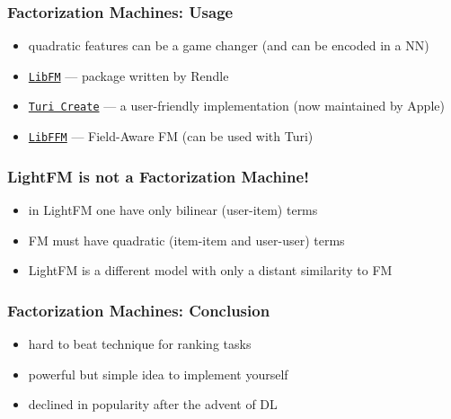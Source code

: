 \documentclass{beamer}
\begin{document}
\begin{frame}
  \frametitle{Factorization Machines: Usage}
  \begin{itemize}
  \item quadratic features can be a game changer (and can be encoded in a NN)
  \item \href{http://libfm.org/}{\texttt{LibFM}} --- package written by Rendle
  \item \href{https://pypi.org/project/turicreate}{\texttt{Turi Create}} --- a user-friendly implementation (now maintained by Apple)
  \item \href{https://github.com/ycjuan/libffm}{\texttt{LibFFM}} --- Field-Aware FM (can be used with Turi)
  \end{itemize}
\end{frame}
\begin{frame}
  \frametitle{LightFM is not a Factorization Machine!}
  \begin{itemize}
  \item in LightFM one have only bilinear (user-item) terms
  \item FM must have quadratic (item-item and user-user) terms
  \item LightFM is a different model with only a distant similarity to FM
  \end{itemize}
\end{frame}
\begin{frame}
  \frametitle{Factorization Machines: Conclusion}
  \begin{itemize}
  \item hard to beat technique for ranking tasks
  \item powerful but simple idea to implement yourself
  \item declined in popularity after the advent of DL
  \end{itemize}
\end{frame}
\end{document}
